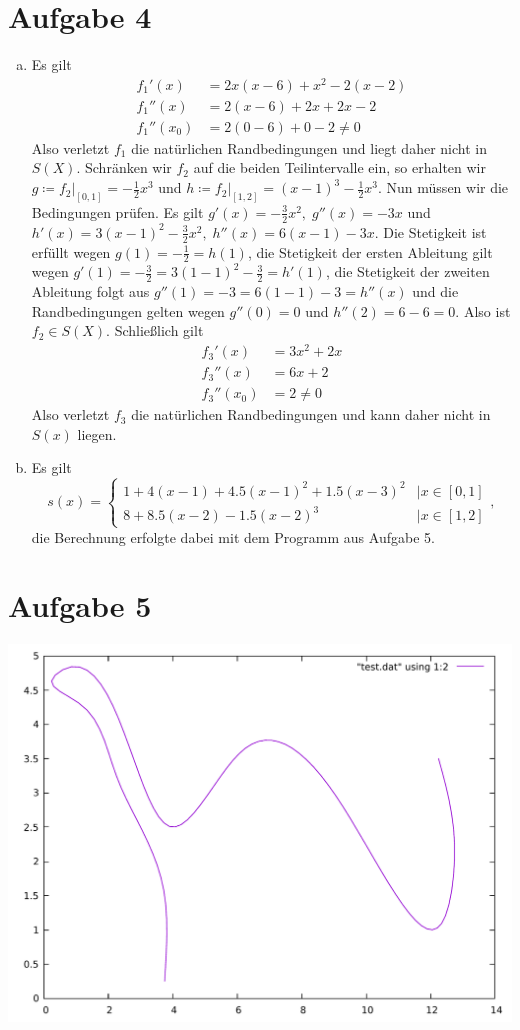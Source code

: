 \documentclass{article}
\theoremstyle{definition}
\begin{document}
\section*{Aufgabe 4}
\begin{enumerate}[(a)]
    \item Es gilt
    \begin{align*}
        f_1'(x) &= 2x(x-6) + x^2 - 2(x-2)\\
        f_1''(x)&= 2(x-6) + 2x + 2x - 2\\
        f_1''(x_0)&= 2(0-6) + 0 - 2 \neq 0
    \end{align*}
    Also verletzt $f_1$ die natürlichen Randbedingungen und liegt daher nicht in $S(X)$.
    Schränken wir $f_2$ auf die beiden Teilintervalle ein, so erhalten wir $g \coloneqq f_2|_{[0,1]} = -\frac{1}{2}x^3$ und $h \coloneqq f_2|_{[1,2]} = (x-1)^3 - \frac{1}{2}x^3$. Nun müssen wir die Bedingungen prüfen. Es gilt $g'(x) = - \frac{3}{2}x^2,\; g''(x) = -3x$ und $h'(x) = 3(x-1)^2 - \frac{3}{2}x^2,\; h''(x) = 6(x-1) - 3x$. Die Stetigkeit ist erfüllt wegen $g(1) = -\frac{1}{2} = h(1)$, die Stetigkeit der ersten Ableitung gilt wegen $g'(1) = - \frac{3}{2} = 3(1-1)^2 - \frac{3}{2} = h'(1)$, die Stetigkeit der zweiten Ableitung folgt aus $g''(1) = -3 = 6(1-1) - 3 = h''(x)$ und die Randbedingungen gelten wegen $g''(0) = 0$ und $h''(2) = 6 - 6 = 0$. Also ist $f_2 \in S(X)$.
    Schließlich gilt
    \begin{align*}
        f_3'(x) &= 3x^2 + 2x\\
        f_3''(x) &= 6x + 2\\
        f_3''(x_0) &= 2 \neq 0
    \end{align*}
    Also verletzt $f_3$ die natürlichen Randbedingungen und kann daher nicht in $S(x)$ liegen.
    \item Es gilt 
    \[
        s(x) = \begin{cases}
            1 + 4(x-1) + 4.5(x-1)^2 + 1.5(x-3)^2 &| x\in [0,1]\\
            8 + 8.5(x-2) -1.5 (x-2)^3 &| x\in [1,2]
        \end{cases},
    \]
    die Berechnung erfolgte dabei mit dem Programm aus Aufgabe 5.
\end{enumerate}
\section*{Aufgabe 5}
\includegraphics[width=\textwidth]{brontosaurus.pdf}
\end{document}
